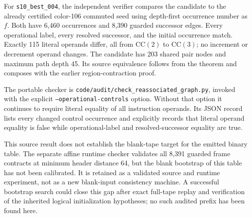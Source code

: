 For \texttt{s10\_best\_004}, the independent verifier compares the
candidate to the already certified color-106 commuted seed using
depth-first occurrence number as $f$.  Both have 6,460 occurrences and
8,390 guarded successor edges.  Every operational label, every resolved
successor, and the initial occurrence match.  Exactly 115 literal
operands differ, all from $\mathrm{CC}(2)$ to $\mathrm{CC}(3)$; no
increment or decrement operand changes.  The candidate has 203 shared
pair nodes and maximum path depth 45.  Its source equivalence follows
from the theorem and composes with the earlier region-contraction proof.

The portable checker is
\texttt{code/audit/check\_reassociated\_graph.py}, invoked with the
explicit \texttt{--operational-controls} option.  Without that option it
continues to require literal equality of all instruction operands.  Its
JSON record lists every changed control occurrence and explicitly records
that literal operand equality is false while operational-label and
resolved-successor equality are true.

This source result does not establish the blank-tape target for the
emitted binary table.  The separate affine runtime checker validates all
8,391 guarded frame contracts at minimum header distance 64, but the
blank bootstrap of this table has not been calibrated.  It is retained
as a validated source and runtime experiment, not as a new blank-input
consistency machine.  A successful bootstrap search could close this gap
after exact full-tape replay and verification of the inherited logical
initialization hypotheses; no such audited prefix has been found here.
